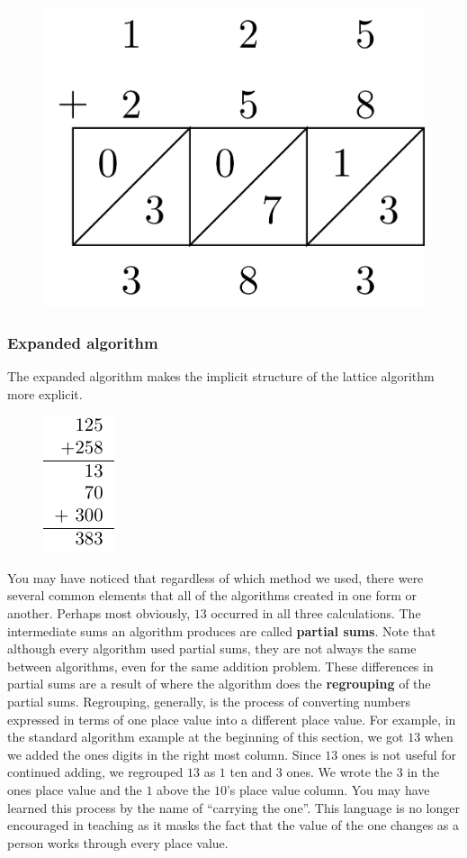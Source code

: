 \documentclass[
]{book}
\theoremstyle{definition}
\theoremstyle{definition}
\theoremstyle{definition}
\theoremstyle{definition}
\theoremstyle{remark}
\begin{document}
\begin{figure}

{\centering \includegraphics[width=0.2\linewidth]{tikz/lattice-addition3} 

}

\end{figure}

\hypertarget{expanded-algorithm}{%
\subsubsection*{Expanded algorithm}\label{expanded-algorithm}}

The expanded algorithm makes the implicit structure of the lattice algorithm more explicit.

\begin{figure}

{\centering \includegraphics[width=0.1\linewidth]{tikz/addition-model-algorithm-expanded} 

}

\end{figure}

You may have noticed that regardless of which method we used, there were several common elements that all of the algorithms created in one form or another. Perhaps most obviously, \(13\) occurred in all three calculations. The intermediate sums an algorithm produces are called \textbf{partial sums}. Note that although every algorithm used partial sums, they are not always the same between algorithms, even for the same addition problem. These differences in partial sums are a result of where the algorithm does the \textbf{regrouping} of the partial sums. Regrouping, generally, is the process of converting numbers expressed in terms of one place value into a different place value. For example, in the standard algorithm example at the beginning of this section, we got \(13\) when we added the ones digits in the right most column. Since \(13\) ones is not useful for continued adding, we regrouped \(13\) as \(1\) ten and \(3\) ones. We wrote the \(3\) in the ones place value and the \(1\) above the \(10\)'s place value column. You may have learned this process by the name of ``carrying the one''. This language is no longer encouraged in teaching as it masks the fact that the value of the one changes as a person works through every place value.
\end{document}

